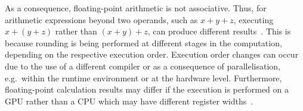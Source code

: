 \documentclass[letterpaper, 10 pt, journal, twoside]{IEEEtran}
\begin{document}
%
As a consequence, floating-point arithmetic is not associative. Thus, for arithmetic expressions beyond two operands, such as $x+y+z$, executing $x+(y+z)$ rather than $(x+y)+z$, can produce different results~\cite{Kapre2007}. This is because rounding is being performed at different stages in the computation, depending on the respective execution order. 
%
Execution order changes can occur due to the use of a different compiler or as a consequence of parallelisation, e.g.\ within the runtime environment or at the hardware level. 
%
Furthermore, floating-point calculation results may differ if the execution is performed on a GPU rather than a CPU which may have different register widths~\cite{Whitehead2011}. 
%
%
%
\end{document}
